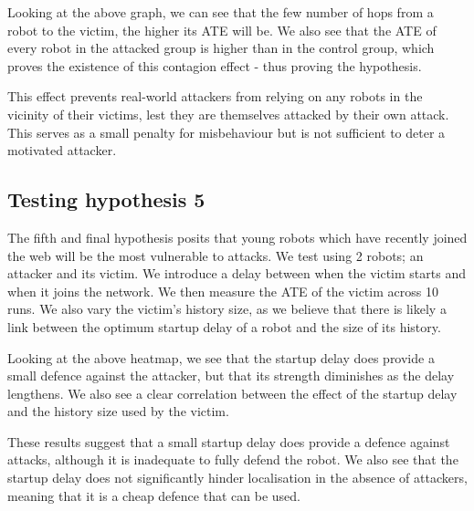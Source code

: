 
Looking at the above graph, we can see that the few number of hops from a robot to the victim, the higher its ATE will be. We also see that the ATE of every robot in the attacked group is higher than in the control group, which proves the existence of this contagion effect - thus proving the hypothesis.

This effect prevents real-world attackers from relying on any robots in the vicinity of their victims, lest they are themselves attacked by their own attack. This serves as a small penalty for misbehaviour but is not sufficient to deter a motivated attacker.

\subsection{Testing hypothesis 5}
The fifth and final hypothesis posits that young robots which have recently joined the web will be the most vulnerable to attacks. We test using 2 robots; an attacker and its victim. We introduce a delay between when the victim starts and when it joins the network. We then measure the ATE of the victim across 10 runs. We also vary the victim's history size, as we believe that there is likely a link between the optimum startup delay of a robot and the size of its history.

Looking at the above heatmap, we see that the startup delay does provide a small defence against the attacker, but that its strength diminishes as the delay lengthens. We also see a clear correlation between the effect of the startup delay and the history size used by the victim.

These results suggest that a small startup delay does provide a defence against attacks, although it is inadequate to fully defend the robot. We also see that the startup delay does not significantly hinder localisation in the absence of attackers, meaning that it is a cheap defence that can be used.

